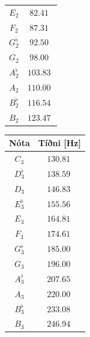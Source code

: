 \ifdefined \wholebook \else\documentclass[oneside]{book}\usepackage{EdlBook}\graphicspath{{figures/}}
\begin{document}
\begin{table}[H]
\begin{center}
\begin{tabular}{|c|c|}
$E_2$ & $\SI{82.41}{}$ \\
$F_2$ & $\SI{87.31}{}$ \\
$G^\flat_2$ & $\SI{92.50}{}$ \\
$G_2$ & $\SI{98.00}{}$ \\
$A^\flat_2$ & $\SI{103.83}{}$ \\
$A_2$ & $\SI{110.00}{}$ \\
$B^\flat_2$ & $\SI{116.54}{}$ \\
$B_2$ & $\SI{123.47}{}$ \\
\hline
\end{tabular}
\quad
\begin{tabular}{|c|c|}
\hline
\textbf{Nóta} & \textbf{Tíðni [Hz]} \\
\hline
\hline
$C_3$ & $\SI{130.81}{}$ \\
$D^\flat_3$ & $\SI{138.59}{}$ \\
$D_3$ & $\SI{146.83}{}$ \\
$E^\flat_3$ & $\SI{155.56}{}$ \\
$E_3$ & $\SI{164.81}{}$ \\
$F_3$ & $\SI{174.61}{}$ \\
$G^\flat_3$ & $\SI{185.00}{}$ \\
$G_3$ & $\SI{196.00}{}$ \\
$A^\flat_3$ & $\SI{207.65}{}$ \\
$A_3$ & $\SI{220.00}{}$ \\
$B^\flat_3$ & $\SI{233.08}{}$ \\
$B_3$ & $\SI{246.94}{}$ \\
\hline
\end{tabular}
\label{tafla:las}
\end{center}
\end{table}
\end{document}
